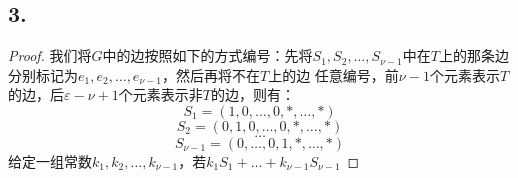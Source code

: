\documentclass{article}
\begin{document}
\subsection*{3.}
\begin{proof}
    我们将$G$中的边按照如下的方式编号：先将$S_1,S_2,\ldots,S_{\nu -1}$中在$T$上的那条边分别标记为$e_1,e_2,\ldots,e_{\nu -1}$，然后再将不在$T$上的边
    任意编号，前$\nu -1$个元素表示$T$的边，后$\varepsilon - \nu +1$个元素表示非$T$的边，则有：
    \[
        S_1= (1,0,\ldots,0,*,\ldots,*)
    \]
    \[
        S_2= (0,1,0,\ldots,0,*,\ldots,*)
    \]
    \[
        \ldots
    \]
    \[
        S_{\nu -1}= (0,\ldots,0,1,*,\ldots,*)
    \]
    给定一组常数$k_1,k_2,\ldots,k_{\nu -1}$，若$k_1 S_1+\ldots+k_{\nu -1} S_{\nu-1}$
\end{proof}
\end{document}
